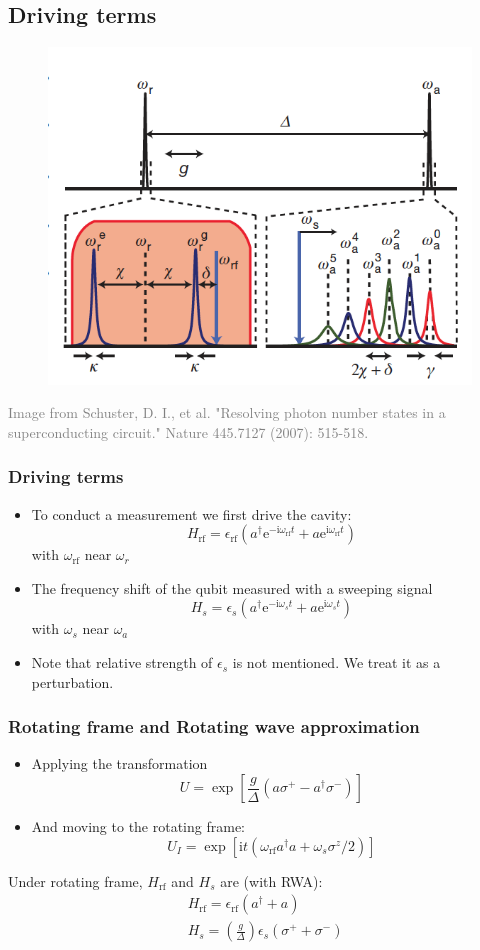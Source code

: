 \documentclass[xcolor=dvipsnames,hyperref={CJKbookmarks=true}]{beamer}
\newcommand\mi{\mathrm{i}}
\newcommand\e{\mathrm{e}}
\newcommand{\rf}{\text{rf}}
\begin{document}
\subsection{Driving terms}
\begin{frame}
\begin{figure}
\centering
\includegraphics[width=0.7\linewidth]{TransitionLines}
\end{figure}
\tiny{\textcolor{gray}{Image from Schuster, D. I., et al. "Resolving photon number states in a superconducting circuit." Nature 445.7127 (2007): 515-518.\cite{schuster2007resolving}}}
\end{frame}

\begin{frame}
\frametitle{Driving terms}
\begin{itemize}
\item To conduct a measurement we first drive the cavity:
    $$
      H_{\rf} = \epsilon_{\rf}\left(a^{\dagger}\e^{-\mi\omega_{\rf}t}
      +a\e^{\mi\omega_{\rf}t} \right)
    $$
with $\omega_{\rf}$ near $\omega_r$
\item The frequency shift of the qubit measured with a sweeping signal
    $$
      H_{s} = \epsilon_{s}\left(a^{\dagger}\e^{-\mi\omega_{s}t}
      +a\e^{\mi\omega_{s}t} \right)
    $$
with $\omega_{s}$ near $\omega_a$
\item Note that relative strength of $\epsilon_s$ is not mentioned. We treat it 
as a perturbation. 
\end{itemize}
\end{frame}

\begin{frame}
\frametitle{Rotating frame and Rotating wave approximation}
\begin{itemize}
\item Applying the transformation
$$U=\exp\left[\dfrac{g}{\Delta}\left(a\sigma^{+}-a^{\dagger}\sigma^{-} \right)\right]$$
\item And moving to the rotating frame:
$$U_I=\exp\left[\mi t\left(
\omega_{\rf}a^{\dagger}a +\omega_s\sigma^{z}/2 \right)\right]$$
\end{itemize}
Under rotating frame, $H_{\rf}$ and $H_{s}$ are (with RWA):
\begin{align*}
	&H_{\rf} = \epsilon_{\rf}\left(a^{\dagger}+a\right) \\
	&H_{s} = \left(\frac{g}{\Delta}\right)\epsilon_{s}\left(\sigma^{+}+\sigma^{-} \right)
\end{align*}
\end{frame}
\end{document}
